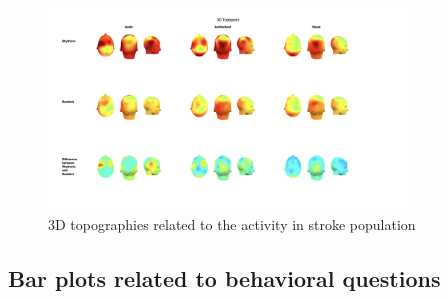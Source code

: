 \begin{figure}[htbp]
    \centering
    \includegraphics[width=0.85\textwidth]{stroke_images/3d_topographies.png}
    \caption{3D topographies related to the activity in stroke population}
    \label{fig: 3D topographies stroke group}   
\end{figure} 
\clearpage

\subsection*{Bar plots related to behavioral questions}

